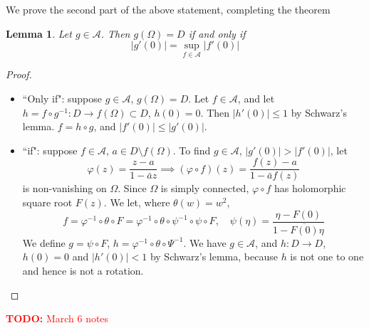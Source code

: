 \documentclass{article}
\newtheorem{lemma}{Lemma}
\newcommand{\mc}[1]{\mathcal{#1}}
\newcommand{\TODO}[1]{\begin{center}\huge{\textcolor{red}{\textbf{TODO:} #1}}\end{center}}
\begin{document}
We prove the second part of the above statement, completing the theorem
\begin{lemma}
Let \(g \in \mc{A}\). Then \(g(\Omega) = D\) if and only if
\begin{equation}|g'(0)| = \sup_{f \in \mc{A}}|f'(0)|\end{equation}
\end{lemma}
\begin{proof}
\begin{itemize}

  \item ``Only if": suppose \(g \in \mc{A}\), \(g(\Omega) = D\). Let \(f \in \mc{A}\), and let \(h = f \circ g^{-1}: D \to f(\Omega) \subset D\), \(h(0) = 0\). Then \(|h'(0)| \leq 1\) by Schwarz's lemma. \(f = h \circ g\), and \(|f'(0)| \leq |g'(0)|\).

  \item ``if": suppose \(f \in \mc{A}\), \(a \in D \setminus f(\Omega)\). To find \(g \in \mc{A}\), \(|g'(0)| > |f'(0)|\), let
  \begin{equation}\varphi(z) = \frac{z - a}{1 - \bar{a}z} \implies (\varphi \circ f)(z) = \frac{f(z) - a}{1 - \bar{a}f(z)}\end{equation}
  is non-vanishing on \(\Omega\). Since \(\Omega\) is simply connected, \(\varphi \circ f\) has holomorphic square root \(F(z)\). We let, where \(\theta(w) = w^2\),
  \begin{equation}f = \varphi^{-1} \circ \theta \circ F = \varphi^{-1} \circ \theta \circ \psi^{-1} \circ \psi \circ F, \quad \psi(\eta) = \frac{\eta - F(0)}{1 - \overline{F(0)}\eta}\end{equation}
  We define \(g = \psi \circ F\), \(h = \varphi^{-1} \circ \theta \circ \Psi^{-1}\). We have \(g \in \mc{A}\), and \(h: D \to D\), \(h(0) = 0\) and \(|h'(0)| < 1\) by Schwarz's lemma, because \(h\) is not one to one and hence is not a rotation.

\end{itemize}
\end{proof}

\TODO{March 6 notes}
\end{document}
